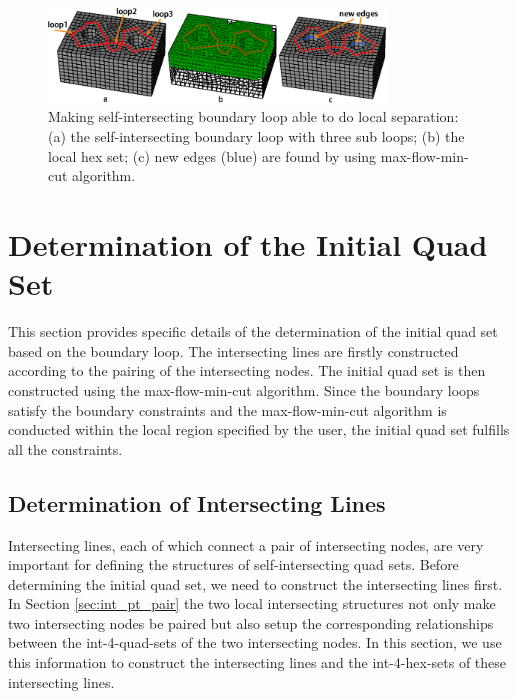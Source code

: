 \documentclass[final,5p,times,twocolumn]{elsarticle}
\begin{document}
\begin{figure}[htbp]
\begin{center}
\includegraphics[width=9cm]{figures/int_loop_local_sep.png}
\caption{Making self-intersecting boundary loop able to do local separation: (a) the self-intersecting boundary loop with three sub loops; (b) the local hex set; (c) new edges (blue) are found by using max-flow-min-cut algorithm.}
\label{fig:int_loop_local_sep}
\end{center}
\end{figure}

\section{Determination of the Initial Quad Set}
\label{sec:det_quad_set}
This section provides specific details of the determination of the initial quad set based on the boundary loop. The intersecting lines are firstly constructed according to the pairing of the intersecting nodes. The initial quad set is then constructed using the max-flow-min-cut algorithm. Since the boundary loops satisfy the boundary constraints and the max-flow-min-cut algorithm is conducted within the local region specified by the user, the initial quad set fulfills all the constraints.

\subsection{Determination of Intersecting Lines}
\label{sec:det_int_lines}
Intersecting lines, each of which connect a pair of intersecting nodes, are very important for defining the structures of self-intersecting quad sets. Before determining the initial quad set, we need to construct the intersecting lines first. In Section \ref{sec:int_pt_pair} the two local intersecting structures not only make two intersecting nodes be paired but also setup the corresponding relationships between the int-4-quad-sets of the two intersecting nodes. In this section, we use this information to construct the intersecting lines and the int-4-hex-sets of these intersecting lines.
\end{document}
